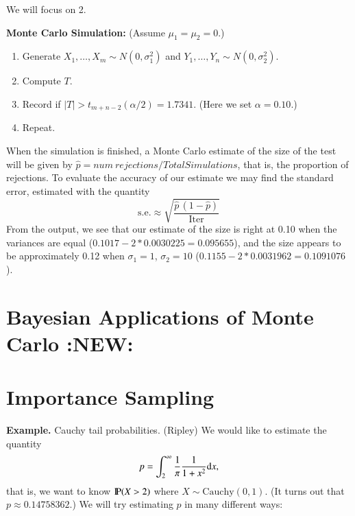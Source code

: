 \documentclass[captions=tableheading]{scrbook}
\begin{document}
We will focus on 2.

\textbf{Monte Carlo Simulation:} (Assume $\mu_{1}=\mu_{2}=0$.)

\begin{enumerate}
\item Generate $X_{1},\ldots,X_{m}\sim N(0,\sigma_{1}^{2})$ and $Y_{1},\ldots,Y_{n}\sim N(0,\sigma_{2}^{2})$.
\item Compute $T$.
\item Record if $|T|>t_{m+n-2}(\alpha/2)=1.7341$. (Here we set $\alpha=0.10$.)
\item Repeat.
\end{enumerate}

When the simulation is finished, a Monte Carlo estimate of the size of the test will be given by $\hat{p}=\mathit{num\ rejections/TotalSimulations}$, that is, the proportion of rejections. To evaluate the accuracy of our estimate we may find the standard error, estimated with the quantity
\[
\mathrm{s.e.}\approx\sqrt{\frac{\hat{p}\,(1-\hat{p})}{\mathrm{Iter}}}
\]
From the output, we see that our estimate of the size is right at 0.10 when the variances are equal ($0.1017-2*0.0030225=0.095655$), and the size appears to be approximately 0.12 when $\sigma_{1}=1$, $\sigma_{2}=10$ ($0.1155-2*0.0031962=0.1091076$).  
\section{Bayesian Applications of Monte Carlo \textbf{:NEW:}}
\label{sec-3_3}
\section{Importance Sampling}
\label{sec-3_4}


\textbf{Example.} Cauchy tail probabilities. (Ripley) We would like to estimate the quantity 
\[
p=\int_{2}^{\infty}\frac{1}{\pi}\frac{1}{1+x^{2}}\diff x,
\]
that is, we want to know $\P(X > 2)$ where $X \sim \mathrm{Cauchy}(0,1)$. (It turns out that $p\approx 0.14758362$.) We will try estimating $p$ in many different ways:
\end{document}
